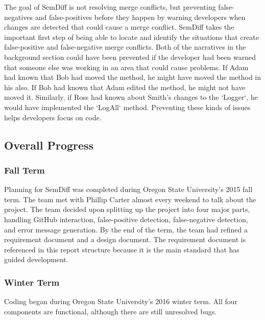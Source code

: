 \documentclass[draftclsnofoot,onecolumn]{IEEEtran}
\begin{document}
The goal of SemDiff is not resolving merge conflicts, but preventing 
false-negatives and false-positives before they happen by warning developers 
when changes are detected that could cause a merge conflict. SemDiff takes the 
important first step of being able to locate and identify the situations that 
create false-positive and false-negative merge conflicts. Both of the 
narratives in the background section could have been prevented if the developer 
had been warned that someone else was working in an area that could cause 
problems. If Adam had known that Bob had moved the method, he might have moved 
the method in his also. If Bob had known that Adam edited the method, he might 
not have moved it. Similarly, if Ross had known about Smith’s changes to the 
`Logger`, he would have implemented the `LogAll` method. Preventing these kinds 
of issues helps developers focus on code.

\subsection{Overall Progress}%

\subsubsection{Fall Term}

Planning for SemDiff was completed during Oregon State University’s 2015 fall 
term. The team met with Phillip Carter almost every weekend to talk about the 
project. The team decided upon splitting up the project into four major parts, 
handling GitHub interaction, false-positive detection, false-negative 
detection, and error message generation. By the end of the term, the team had 
refined a requirement document and a design document. The requirement document 
is referenced in this report structure because it is the main standard that has 
guided development.

\subsubsection{Winter Term}

Coding began during Oregon State University’s 2016 winter term. All four 
components are functional, although there are still unresolved bugs. 
\end{document}
